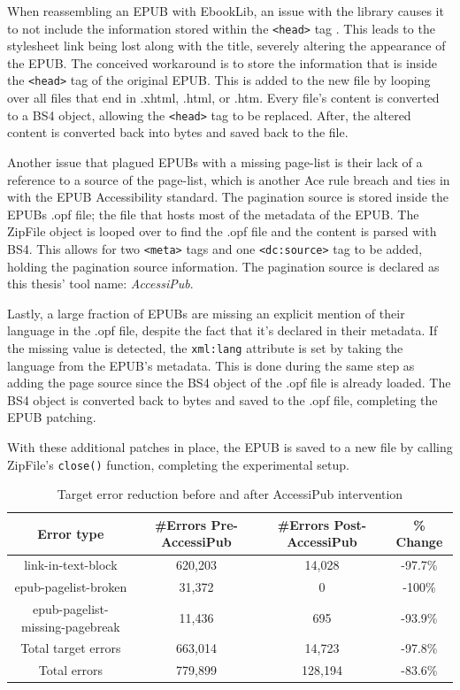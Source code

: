 When reassembling an EPUB with EbookLib, an issue with the library causes it to not include the information stored within the \texttt{<head>} tag \cite{EbookLibHeadTag}. 
This leads to the stylesheet link being lost along with the title, severely altering the appearance of the EPUB. The conceived workaround is to store the information that is inside the \texttt{<head>} tag of the original EPUB. This is added to the new file by looping over all files that end in .xhtml, .html, or .htm. Every file's content is converted to a BS4 object, allowing the \texttt{<head>} tag to be replaced. After, the altered content is converted back into bytes and saved back to the file.


Another issue that plagued EPUBs with a missing page-list is their lack of a reference to a source of the page-list, which is another Ace rule breach and ties in with the EPUB Accessibility standard. The pagination source is stored inside the EPUBs .opf file; the file that hosts most of the metadata of the EPUB. The ZipFile object is looped over to find the .opf file and the content is parsed with BS4. This allows for two \texttt{<meta>} tags and one \texttt{<dc:source>} tag to be added, holding the pagination source information. The pagination source is declared as this thesis' tool name: \textit{AccessiPub}.

Lastly, a large fraction of EPUBs are missing an explicit mention of their language in the .opf file, despite the fact that it's declared in their metadata. If the missing value is detected, the \texttt{xml:lang} attribute is set by taking the language from the EPUB's metadata. This is done during the same step as adding the page source since the BS4 object of the .opf file is already loaded. The BS4 object is converted back to bytes and saved to the .opf file, completing the EPUB patching.

With these additional patches in place, the EPUB is saved to a new file by calling ZipFile's \texttt{close()} function, completing the experimental setup.

\begin{table}[t!]
\begin{center}
\begin{tabular}{ | c || c | c | c |}  
\hline
\textbf{Error type} & \textbf{\#Errors Pre-AccessiPub} & \textbf{\#Errors Post-AccessiPub} & \textbf{\% Change} \\
\hline
link-in-text-block & 620,203 & 14,028 & -97.7\% \\
\hline
epub-pagelist-broken & 31,372 & 0 & -100\% \\
\hline
epub-pagelist-missing-pagebreak & 11,436 & 695 & -93.9\% \\
\hline
\hline
Total target errors & 663,014 & 14,723 & -97.8\% \\
\hline
Total errors & 779,899 & 128,194 & -83.6\% \\
\hline
\end{tabular}
\end{center}
\normalsize
\caption{Target error reduction before and after AccessiPub intervention}
\label{table:targetreduction}
\end{table}

